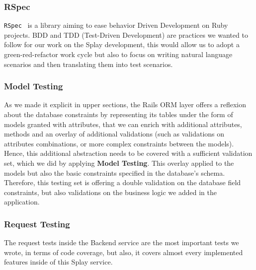 \documentclass{eplmastersthesis}
\begin{document}
        \subsubsection{RSpec}

          \texttt{RSpec}~\cite{rspec} is a library aiming to ease behavior Driven
          Development on Ruby projects. BDD and TDD (Test-Driven Development) are
          practices we wanted to follow for our work on the Splay development,
          this would allow us to adopt a green-red-refactor work cycle but also
          to focus on writing natural language scenarios and then translating
          them into test scenarios.

        \subsubsection{Model Testing}

          As we made it explicit in upper sections, the Rails ORM layer offers
          a reflexion about the database constraints by representing its
          tables under the form of models granted with attributes, that we can
          enrich with additional attributes, methods and an overlay of
          additional validations (such as validations on attributes
          combinations, or more complex constraints between the models).\\

          Hence, this additional abstraction needs to be covered with a
          sufficient validation set, which we did by applying
          \textbf{Model Testing}. This overlay applied to the
          models but also the basic constraints specified in the database's
          schema.\\

          Therefore, this testing set is offering a double validation on the
          database field constraints, but also validations on the business
          logic we added in the application.

        \subsubsection{Request Testing}

          The request tests inside the Backend service are the most important
          tests we wrote, in terms of code coverage, but also, it covers almost 
          every implemented features inside of this Splay service.\\
\end{document}
